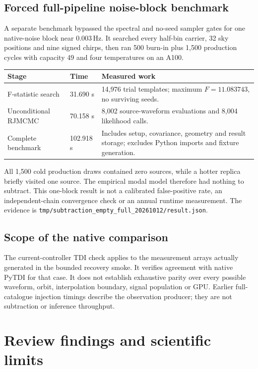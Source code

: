\documentclass[11pt,a4paper]{article}
\newcommand{\code}[1]{\texttt{\nolinkurl{#1}}}
\newcommand{\Hz}{\,\mathrm{Hz}}
\begin{document}
\subsection{Forced full-pipeline noise-block benchmark}

A separate benchmark bypassed the spectral and no-seed sampler gates for
one native-noise block near \(0.003\Hz\). It searched every half-bin carrier,
32 sky positions and nine signed chirps, then ran 500 burn-in plus 1,500
production cycles with capacity 49 and four temperatures on an A100.

{\small
\begin{tabularx}{\textwidth}{P{0.30\textwidth}P{0.18\textwidth}X}
\toprule Stage & Time & Measured work\\\midrule
F-statistic search & 31.690 s & 14,976 trial templates; maximum \(F=11.083743\), no surviving seeds.\\
Unconditional RJMCMC & 70.158 s & 8,002 source-waveform evaluations and 8,004 likelihood calls.\\
Complete benchmark & 102.918 s & Includes setup, covariance, geometry and result storage; excludes Python imports and fixture generation.\\
\bottomrule
\end{tabularx}}

All 1,500 cold production draws contained zero sources, while a hotter replica
briefly visited one source. The empirical modal model therefore had nothing
to subtract. This one-block result is not a calibrated false-positive rate,
an independent-chain convergence check or an annual runtime measurement.
The evidence is \code{tmp/subtraction_empty_full_20261012/result.json}.

\subsection{Scope of the native comparison}

The current-controller TDI check applies to the measurement arrays actually
generated in the bounded recovery smoke. It verifies agreement with native
PyTDI for that case. It does not establish exhaustive parity over every
possible waveform, orbit, interpolation boundary, signal population or GPU.
Earlier full-catalogue injection timings describe the observation producer;
they are not subtraction or inference throughput.

\section{Review findings and scientific limits}
\label{sec:findings}
\end{document}
